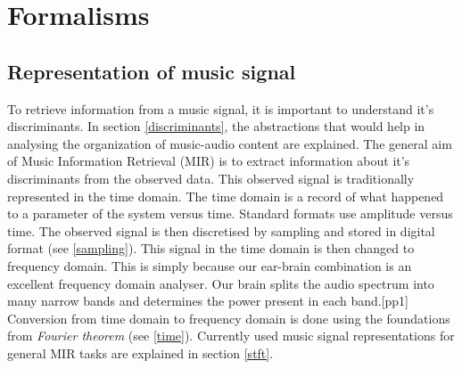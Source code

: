 




\chapter{Formalisms} %

\label{Chapter2} %







\section{Representation of music signal}

To retrieve information from a music signal, it is important to understand it's discriminants. In section \ref{discriminants}, the abstractions that would help in analysing the organization of music-audio content are explained. The general aim of Music Information Retrieval (MIR) is to extract information about it's discriminants from the observed data. This observed signal is traditionally represented in the time domain. The time domain is a record of what happened to a parameter of the system versus time. Standard formats use amplitude versus time. The observed signal is then discretised by sampling and stored in digital format (see \ref{sampling}). This signal in the time domain is then changed to frequency domain. This is simply because our ear-brain combination is an excellent frequency domain analyser. Our brain splits the audio spectrum into many narrow bands and determines the power present in each band.[pp1] Conversion from time domain to frequency domain is done using the foundations from \textit{Fourier theorem} (see \ref{time}). Currently used music signal representations for general MIR tasks are explained in section \ref{stft}.


